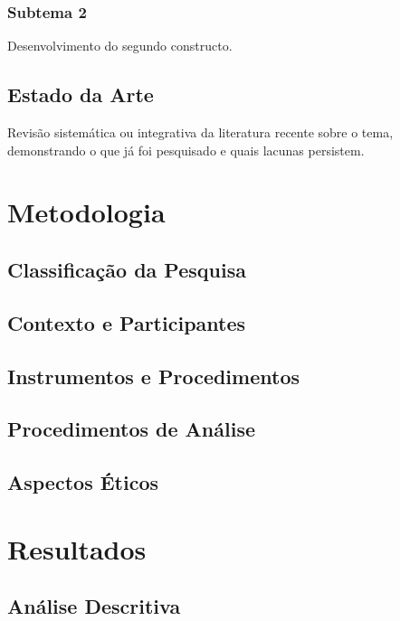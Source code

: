 \documentclass[
  12pt,
  openright,
  twoside,
  a4paper,
  brazilian
]{abntex2}
\begin{document}
\subsection{Subtema 2}

Desenvolvimento do segundo constructo.

\section{Estado da Arte}

Revisão sistemática ou integrativa da literatura recente sobre o tema,
demonstrando o que já foi pesquisado e quais lacunas persistem.

\chapter[Metodologia]{Metodologia}

\section{Classificação da Pesquisa}

\section{Contexto e Participantes}

\section{Instrumentos e Procedimentos}

\section{Procedimentos de Análise}

\section{Aspectos Éticos}

\chapter[Resultados]{Resultados}

\section{Análise Descritiva}
\end{document}
